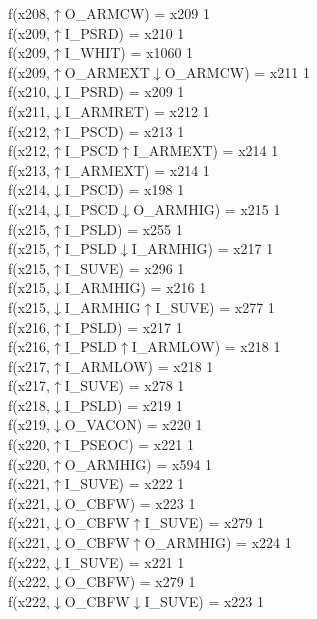f(x208,$\uparrow$O\_ARMCW) = x209 {1} \\
f(x209,$\uparrow$I\_PSRD) = x210 {1} \\
f(x209,$\uparrow$I\_WHIT) = x1060 {1} \\
f(x209,$\uparrow$O\_ARMEXT$\downarrow$O\_ARMCW) = x211 {1} \\
f(x210,$\downarrow$I\_PSRD) = x209 {1} \\
f(x211,$\downarrow$I\_ARMRET) = x212 {1} \\
f(x212,$\uparrow$I\_PSCD) = x213 {1} \\
f(x212,$\uparrow$I\_PSCD$\uparrow$I\_ARMEXT) = x214 {1} \\
f(x213,$\uparrow$I\_ARMEXT) = x214 {1} \\
f(x214,$\downarrow$I\_PSCD) = x198 {1} \\
f(x214,$\downarrow$I\_PSCD$\downarrow$O\_ARMHIG) = x215 {1} \\
f(x215,$\uparrow$I\_PSLD) = x255 {1} \\
f(x215,$\uparrow$I\_PSLD$\downarrow$I\_ARMHIG) = x217 {1} \\
f(x215,$\uparrow$I\_SUVE) = x296 {1} \\
f(x215,$\downarrow$I\_ARMHIG) = x216 {1} \\
f(x215,$\downarrow$I\_ARMHIG$\uparrow$I\_SUVE) = x277 {1} \\
f(x216,$\uparrow$I\_PSLD) = x217 {1} \\
f(x216,$\uparrow$I\_PSLD$\uparrow$I\_ARMLOW) = x218 {1} \\
f(x217,$\uparrow$I\_ARMLOW) = x218 {1} \\
f(x217,$\uparrow$I\_SUVE) = x278 {1} \\
f(x218,$\downarrow$I\_PSLD) = x219 {1} \\
f(x219,$\downarrow$O\_VACON) = x220 {1} \\
f(x220,$\uparrow$I\_PSEOC) = x221 {1} \\
f(x220,$\uparrow$O\_ARMHIG) = x594 {1} \\
f(x221,$\uparrow$I\_SUVE) = x222 {1} \\
f(x221,$\downarrow$O\_CBFW) = x223 {1} \\
f(x221,$\downarrow$O\_CBFW$\uparrow$I\_SUVE) = x279 {1} \\
f(x221,$\downarrow$O\_CBFW$\uparrow$O\_ARMHIG) = x224 {1} \\
f(x222,$\downarrow$I\_SUVE) = x221 {1} \\
f(x222,$\downarrow$O\_CBFW) = x279 {1} \\
f(x222,$\downarrow$O\_CBFW$\downarrow$I\_SUVE) = x223 {1} \\
